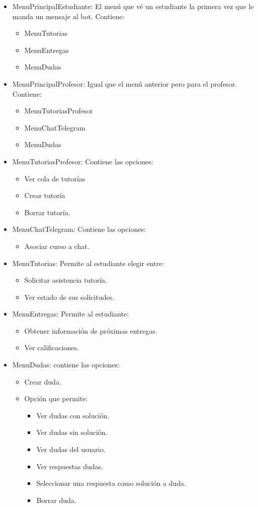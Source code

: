  \begin{itemize}
 \item MenuPrincipalEstudiante: El menú que vé un estudiante la primera vez que le manda un mensaje al bot. Contiene:
 \begin{itemize}
 \item MenuTutorias
 \item MenuEntregas
 \item MenuDudas
 \end{itemize}
 \item MenuPrincipalProfesor: Igual que el menú anterior pero para el profesor. Contiene:
 \begin{itemize}
 \item MenuTutoriasProfesor
 \item MenuChatTelegram
 \item MenuDudas
 \end{itemize}
\item MenuTutoriasProfesor: Contiene las opciones:
\begin{itemize}
\item Ver cola de tutorías
\item Crear tutoría
\item Borrar tutoría.
\end{itemize}
\item MenuChatTelegram: Contiene las opciones:
\begin{itemize}
\item Asociar curso a chat.
\end{itemize}
\item MenuTutorias: Permite al estudiante elegir entre:
\begin{itemize}
\item Solicitar asistencia tutoría.
\item Ver estado de sus solicitudes.
\end{itemize}
\item MenuEntregas: Permite al estudiante:
\begin{itemize}
\item Obtener información de próximas entregas.
\item Ver calificaciones.
\end{itemize}
\item MenuDudas: contiene las opciones: 
\begin{itemize}
\item Crear duda.
\item Opción que permite: 
\begin{itemize}
\item Ver dudas con solución.
\item Ver dudas sin solución.
\item Ver dudas del usuario.
\item Ver respuestas dudas.
\item Seleccionar una respuesta como solución a duda.
\item Borrar duda.
\end{itemize}
 \end{itemize}
\end{itemize}

